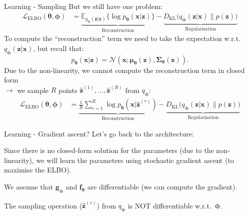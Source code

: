 \documentclass[11pt,aspectratio=169,usenames,dvipsnames]{beamer}
\newcommand{\bs}{\boldsymbol}
\begin{document}
\begin{frame}{Learning - Sampling}
 But we still have one problem:
 \begin{align*}
  \mathcal{L}_{\text{ELBO}}(\bs{\theta},\bs{\phi}) &= \underbrace{\mathbb{E}_{q_{\bs{\phi}}(\bs{z}|\bs{x})}\Big\{\log p_{\bs{\theta}}(\bs{x}|\bs{z})\Big\}}_{\text{Reconstruction}} -  \underbrace{D_{\text{KL}}\Big(q_{\bs{\phi}}(\bs{z}|\bs{x})\Big\lVert p(\bs{z})\Big)}_{\text{Regularisation}}
\end{align*}
To compute the ``reconstruction'' term we need to take the expectation w.r.t.\ $q_{\bs{\phi}}(\bs{z}|\bs{x})$, but recall that:
\begin{equation*}
  p_{\bs{\theta}}(\bs{x}|\bs{z}) = \mathcal{N}(\bs{x};\bs{\mu}_{\bs{\theta}}(\bs{z}),\bs{\Sigma}_{\bs{\theta}}(\bs{z})).
\end{equation*}
Due to the non-linearity, we cannot compute the reconstruction term in closed form\\ $\rightarrow$ we sample $R$ points $\hat{\bs{z}}^{(1)},\ldots,\hat{\bs{z}}^{(R)}$ from $q_{\bs{\phi}}$:
 \begin{align*}
  \mathcal{L}_{\text{ELBO}}(\bs{\theta},\bs{\phi}) &= \underbrace{\frac{1}{R}\sum_{r=1}^R\log p_{\bs{\theta}}(\bs{x}|\hat{\bs{z}}^{(r)})}_{\text{Reconstruction}} -  \underbrace{D_{\text{KL}}\Big(q_{\bs{\phi}}(\bs{z}|\bs{x})\Big\lVert p(\bs{z})\Big)}_{\text{Regularisation}}
\end{align*}
\end{frame}

\begin{frame}{Learning - Gradient ascent?}
  Let's go back to the architecture:\vspace{-3mm}
\begin{figure}
  \centering
  \end{figure}\vspace{-3mm}

  Since there is no closed-form solution for the parameters (due to the non-linearity), we will learn the parameters using stochastic gradient ascent (to maximise the ELBO).\vspace{3mm}

  We assume that $\bs{g}_{\bs{\phi}}$ and $\bs{f}_{\bs{\theta}}$ are differentiable (we can compute the gradient).\vspace{3mm}

  The sampling operation ($\hat{\bs{z}}^{(r)}$) from $q_{\bs{\phi}}$ is {\color{red}NOT} differentiable w.r.t.\ $\bs{\phi}$.
\end{frame}
\end{document}
